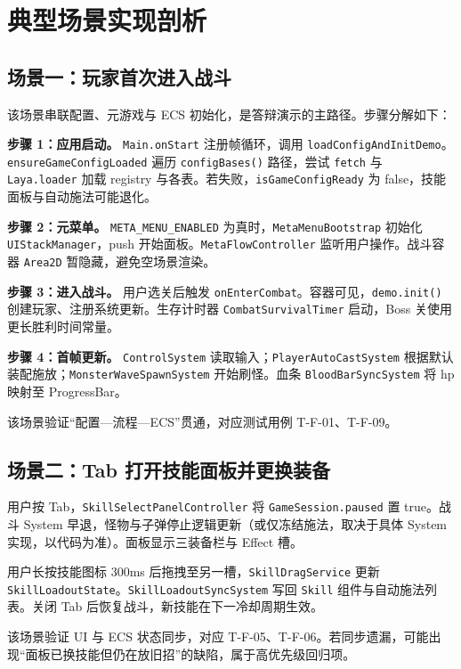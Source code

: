 
\section{典型场景实现剖析}

\subsection{场景一：玩家首次进入战斗}

该场景串联配置、元游戏与 ECS 初始化，是答辩演示的主路径。步骤分解如下：

\textbf{步骤 1：应用启动。} \texttt{Main.onStart} 注册帧循环，调用 \texttt{loadConfigAndInitDemo}。\texttt{ensureGameConfigLoaded} 遍历 \texttt{configBases()} 路径，尝试 \texttt{fetch} 与 \texttt{Laya.loader} 加载 registry 与各表。若失败，\texttt{isGameConfigReady} 为 false，技能面板与自动施法可能退化。

\textbf{步骤 2：元菜单。} \texttt{META\_MENU\_ENABLED} 为真时，\texttt{MetaMenuBootstrap} 初始化 \texttt{UIStackManager}，push 开始面板。\texttt{MetaFlowController} 监听用户操作。战斗容器 \texttt{Area2D} 暂隐藏，避免空场景渲染。

\textbf{步骤 3：进入战斗。} 用户选关后触发 \texttt{onEnterCombat}。容器可见，\texttt{demo.init()} 创建玩家、注册系统更新。生存计时器 \texttt{CombatSurvivalTimer} 启动，Boss 关使用更长胜利时间常量。

\textbf{步骤 4：首帧更新。} \texttt{ControlSystem} 读取输入；\texttt{PlayerAutoCastSystem} 根据默认装配施放；\texttt{MonsterWaveSpawnSystem} 开始刷怪。血条 \texttt{BloodBarSyncSystem} 将 hp 映射至 ProgressBar。

该场景验证“配置—流程—ECS”贯通，对应测试用例 T-F-01、T-F-09。

\subsection{场景二：Tab 打开技能面板并更换装备}

用户按 Tab，\texttt{SkillSelectPanelController} 将 \texttt{GameSession.paused} 置 true。战斗 System 早退，怪物与子弹停止逻辑更新（或仅冻结施法，取决于具体 System 实现，以代码为准）。面板显示三装备栏与 Effect 槽。

用户长按技能图标 300ms 后拖拽至另一槽，\texttt{SkillDragService} 更新 \texttt{SkillLoadoutState}。\texttt{SkillLoadoutSyncSystem} 写回 \texttt{Skill} 组件与自动施法列表。关闭 Tab 后恢复战斗，新技能在下一冷却周期生效。

该场景验证 UI 与 ECS 状态同步，对应 T-F-05、T-F-06。若同步遗漏，可能出现“面板已换技能但仍在放旧招”的缺陷，属于高优先级回归项。

